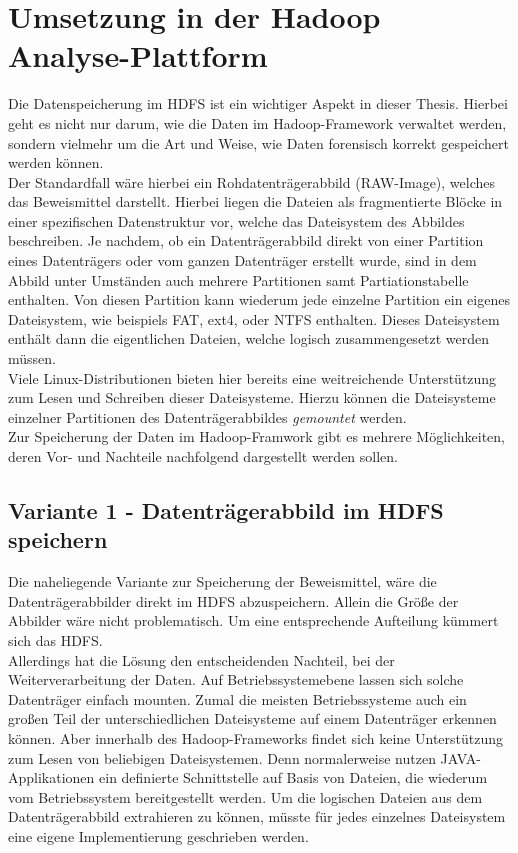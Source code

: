 \section{Umsetzung in der Hadoop Analyse-Plattform}

Die Datenspeicherung im HDFS ist ein wichtiger Aspekt in dieser Thesis. Hierbei geht es nicht nur darum, wie die Daten im Hadoop-Framework verwaltet werden, sondern vielmehr um die Art und Weise, wie Daten forensisch korrekt gespeichert werden können.\\

\noindent
Der Standardfall wäre hierbei ein Rohdatenträgerabbild (RAW-Image), welches das Beweismittel darstellt. Hierbei liegen die Dateien als fragmentierte Blöcke in einer spezifischen Datenstruktur vor, welche das Dateisystem des Abbildes beschreiben. Je nachdem, ob ein Datenträgerabbild direkt von einer Partition eines Datenträgers oder vom ganzen Datenträger erstellt wurde, sind in dem Abbild unter Umständen auch mehrere Partitionen samt Partiationstabelle enthalten. Von diesen Partition kann wiederum jede einzelne Partition ein eigenes Dateisystem, wie beispiels FAT, ext4, oder NTFS enthalten. Dieses Dateisystem enthält dann die eigentlichen Dateien, welche logisch zusammengesetzt werden müssen.\\ Viele Linux-Distributionen bieten hier bereits eine weitreichende Unterstützung zum Lesen und Schreiben dieser Dateisysteme. Hierzu können die Dateisysteme einzelner Partitionen des Datenträgerabbildes \textit{gemountet} werden.\\

\noindent
Zur Speicherung der Daten im Hadoop-Framwork gibt es mehrere Möglichkeiten, deren Vor- und Nachteile nachfolgend dargestellt werden sollen.

\subsection{Variante 1 - Datenträgerabbild im HDFS speichern}

Die naheliegende Variante zur Speicherung der Beweismittel, wäre die Datenträgerabbilder direkt im HDFS abzuspeichern. Allein die Größe der Abbilder wäre nicht problematisch. Um eine entsprechende Aufteilung kümmert sich das HDFS.\\ Allerdings hat die Lösung den entscheidenden Nachteil, bei der Weiterverarbeitung der Daten. Auf Betriebssystemebene lassen sich solche Datenträger einfach mounten. Zumal die meisten Betriebssysteme auch ein großen Teil der unterschiedlichen Dateisysteme auf einem Datenträger erkennen können. Aber innerhalb des Hadoop-Frameworks findet sich keine Unterstützung zum Lesen von beliebigen Dateisystemen. Denn normalerweise nutzen JAVA-Applikationen ein definierte Schnittstelle auf Basis von Dateien, die wiederum vom Betriebssystem bereitgestellt werden. Um die logischen Dateien aus dem Datenträgerabbild extrahieren zu können, müsste für jedes einzelnes Dateisystem eine eigene Implementierung geschrieben werden.\\ 

